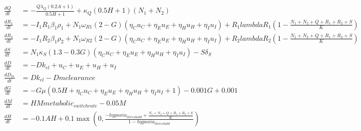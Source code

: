 \documentclass{article}
\begin{document}
\begin{align}
\frac{dQ}{dt} &=  - \frac{Q \lambda_{Q} \left(0.2 A + 1\right)}{0.5 H + 1} + \kappa_{Q} \left(0.5 H + 1\right) \left(N_{1} + N_{2}\right) \\
\frac{dR_1}{dt} &=  - I_{1} R_{1} \beta_{1} \rho_{1} + N_{1} \omega_{R1} \left(2 - G\right) \left(\eta_{C} u_{C} + \eta_{E} u_{E} + \eta_{H} u_{H} + \eta_{I} u_{I}\right) + R_{1} lambdaR_{1} \left(1 - \frac{N_{1} + N_{2} + Q + R_{1} + R_{2} + S}{K}\right) \\
\frac{dR_2}{dt} &=  - I_{1} R_{2} \beta_{1} \rho_{2} + N_{1} \omega_{R2} \left(2 - G\right) \left(\eta_{C} u_{C} + \eta_{E} u_{E} + \eta_{H} u_{H} + \eta_{I} u_{I}\right) + R_{2} lambdaR_{2} \left(1 - \frac{N_{1} + N_{2} + Q + R_{1} + R_{2} + S}{K}\right) \\
\frac{dS}{dt} &=  N_{1} \kappa_{S} \left(1.3 - 0.3 G\right) \left(\eta_{C} u_{C} + \eta_{E} u_{E} + \eta_{H} u_{H} + \eta_{I} u_{I}\right) - S \delta_{S} \\
\frac{dD}{dt} &=  - D k_{el} + u_{C} + u_{E} + u_{H} + u_{I} \\
\frac{dD_m}{dt} &=  D k_{el} - Dm clearance \\
\frac{dG}{dt} &=  - G \mu \left(0.5 H + \eta_{C} u_{C} + \eta_{E} u_{E} + \eta_{H} u_{H} + \eta_{I} u_{I} + 1\right) - 0.001 G + 0.001 \\
\frac{dM}{dt} &=  H M metabolic_{switch rate} - 0.05 M \\
\frac{dH}{dt} &=  - 0.1 A H + 0.1 \max\left(0, \frac{- hypoxia_{threshold} + \frac{N_{1} + N_{2} + Q + R_{1} + R_{2} + S}{K}}{1 - hypoxia_{threshold}}\right)
\end{align}
\end{document}

